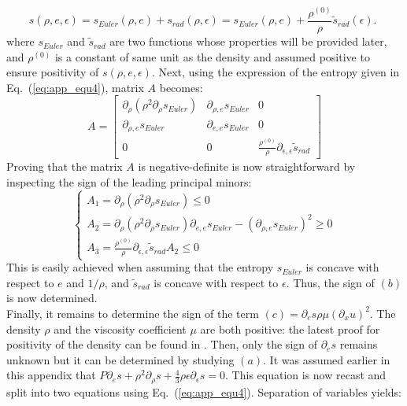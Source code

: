 \documentclass[review]{elsarticle}
\newcommand{\eqt}[1]{Eq.~(\ref{#1})}                     %
\begin{document}
\begin{appendices}
\begin{equation}
\label{eq:app_equ4}
s(\rho, e, \epsilon) = s_{Euler}(\rho,e) + s_{rad}(\rho, \epsilon) = s_{Euler}(\rho,e) + \frac{\rho^{(0)}}{\rho}\tilde{s}_{rad}(\epsilon) \text{. } 
\end{equation}
where $s_{Euler}$ and $\tilde{s}_{rad}$ are two functions whose properties will be provided later, and $\rho^{(0)}$ is a constant of same unit as the density and assumed positive to ensure positivity of $s(\rho,e,\epsilon)$.
Next, using the expression of the entropy given in \eqt{eq:app_equ4}, matrix $A$ becomes:
 \begin{equation}
 A = 
 \left[
 \begin{array}{ccc}
\partial_{\rho} \left( \rho^2 \partial_{\rho} s_{Euler} \right) & \partial_{\rho,e} s_{Euler} & 0 \\
 \partial_{\rho,e} s_{Euler} & \partial_{e,e} s_{Euler} & 0 \\
 0 & 0 & \frac{\rho^{(0)}}{\rho} \partial_{\epsilon,\epsilon} \tilde{s}_{rad}
 \end{array}
 \right] \nonumber
 \end{equation}
 Proving that the matrix $A$ is  negative-definite is now straightforward by inspecting the sign of the leading principal minors:
 \begin{equation}
 \label{eq:A_matrix}
 \left\{
 \begin{array}{lll}
 A_1 = \partial_{\rho} \left( \rho^2 \partial_{\rho} s_{Euler} \right) \leq 0 \\
 A_2 = \partial_{\rho} \left( \rho^2 \partial_{\rho} s_{Euler} \right) \partial_{e,e} s_{Euler} - \left( \partial_{\rho,e} s_{Euler} \right)^2 \geq 0\\
 A_3 =  \frac{\rho^{(0)}}{\rho} \partial_{\epsilon,\epsilon} \tilde{s}_{rad} A_2 \leq 0
 \end{array}
 \right.
 \end{equation} 
This is easily achieved when assuming that the entropy $s_{Euler}$ is concave with respect to $e$ and $1/ \rho$, and $\tilde{s}_{rad}$ is concave with respect to $\epsilon$. Thus, the sign of $(b)$ is now determined. \\
Finally, it remains to determine the sign of the term $(c) = \partial_e s \rho \mu (\partial_x u)^2$. The density $\rho$ and the viscosity coefficient $\mu$ are both positive: the latest proof for positivity of the density can be found in \cite{jlg}. Then, only the sign of $\partial_e s$ remains unknown but it can be determined by studying $(a)$. It was assumed earlier in this appendix that $P \partial_e s + \rho^2 \partial_{\rho} s + \frac{4}{3} \rho \epsilon \partial_{\epsilon} s=0$. This equation is now recast and split into two equations using \eqt{eq:app_equ4}. Separation of variables yields:

\end{appendices}
\end{document}
